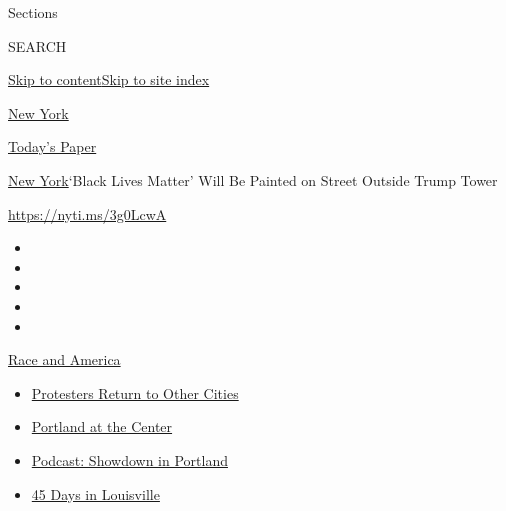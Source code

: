 Sections

SEARCH

\protect\hyperlink{site-content}{Skip to
content}\protect\hyperlink{site-index}{Skip to site index}

\href{https://www.nytimes3xbfgragh.onion/section/nyregion}{New York}

\href{https://myaccount.nytimes3xbfgragh.onion/auth/login?response_type=cookie\&client_id=vi}{}

\href{https://www.nytimes3xbfgragh.onion/section/todayspaper}{Today's
Paper}

\href{/section/nyregion}{New York}\textbar{}`Black Lives Matter' Will Be
Painted on Street Outside Trump Tower

\url{https://nyti.ms/3g0LcwA}

\begin{itemize}
\item
\item
\item
\item
\item
\end{itemize}

\href{https://www.nytimes3xbfgragh.onion/news-event/george-floyd-protests-minneapolis-new-york-los-angeles?action=click\&pgtype=Article\&state=default\&region=TOP_BANNER\&context=storylines_menu}{Race
and America}

\begin{itemize}
\tightlist
\item
  \href{https://www.nytimes3xbfgragh.onion/2020/07/26/us/protests-portland-seattle-trump.html?action=click\&pgtype=Article\&state=default\&region=TOP_BANNER\&context=storylines_menu}{Protesters
  Return to Other Cities}
\item
  \href{https://www.nytimes3xbfgragh.onion/2020/07/24/us/portland-oregon-protests-white-race.html?action=click\&pgtype=Article\&state=default\&region=TOP_BANNER\&context=storylines_menu}{Portland
  at the Center}
\item
  \href{https://www.nytimes3xbfgragh.onion/2020/07/23/podcasts/the-daily/portland-protests.html?action=click\&pgtype=Article\&state=default\&region=TOP_BANNER\&context=storylines_menu}{Podcast:
  Showdown in Portland}
\item
  \href{https://www.nytimes3xbfgragh.onion/interactive/2020/07/16/us/black-lives-matter-protests-louisville-breonna-taylor.html?action=click\&pgtype=Article\&state=default\&region=TOP_BANNER\&context=storylines_menu}{45
  Days in Louisville}
\end{itemize}

